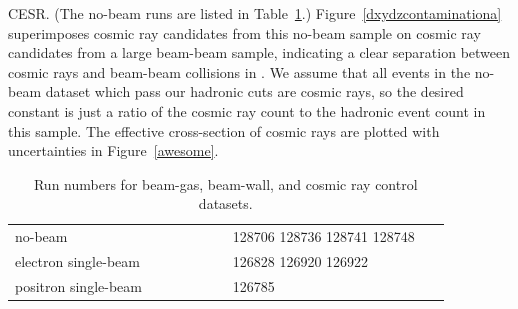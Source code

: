 \documentclass{cornell}
\begin{document}
CESR.  (The no-beam runs are listed in Table~\ref{tab:controls}.)
Figure~\ref{dxydzcontaminationa} superimposes cosmic ray candidates
from this no-beam sample on cosmic ray candidates from a large
beam-beam sample, indicating a clear separation between cosmic rays
and beam-beam collisions in \dxy.
We assume that all events in the no-beam dataset which pass our
hadronic cuts are cosmic rays, so the desired constant is just a ratio
of the cosmic ray count to the hadronic event count in this sample.
The effective cross-section of cosmic rays are plotted with
uncertainties in Figure~\ref{awesome}.

\begin{table}
  \caption[Run numbers for beam-gas, beam-wall, and cosmic ray control
    datasets]{\label{tab:controls} Run numbers for beam-gas,
    beam-wall, and cosmic ray control datasets.}
  \begin{center}
    \begin{tabular}{p{0.45\linewidth} p{0.45\linewidth}}
      \hline\hline
      no-beam & 128706 128736 128741 128748 \\
      electron single-beam & 126828 126920 126922 \\
      positron single-beam & 126785 \\ \hline\hline
    \end{tabular}
  \end{center}
\end{table}
\end{document}
